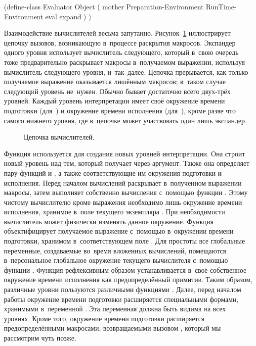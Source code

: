 \begin{code:lisp}
(define-class Evaluator Object
  ( mother
    Preparation-Environment
    RunTime-Environment
    eval
    expand
    ) )
\end{code:lisp}

Взаимодействие вычислителей весьма запутанно.
Рисунок~\ref{macros/macrosystem/eval-level/pic:tower} иллюстрирует цепочку
вызовов, возникающую в~процессе раскрытия макросов. Экспандер одного уровня
использует вычислитель следующего, который в~свою очередь тоже предварительно
раскрывает макросы в~получаемом выражении, используя вычислитель следующего
уровня, и~так~далее. Цепочка прерывается, как только получаемое выражение
оказывается лишённым макросов; в~таком случае следующий уровень не~нужен. Обычно
бывает достаточно всего двух-трёх уровней. Каждый уровень интерпретации имеет
своё окружение времени подготовки (для~) и окружение времени
исполнения (для~), кроме разве что самого нижнего уровня, где в~цепочке
может участвовать один лишь экспандер.

\begin{figure}\centering

\caption{Цепочка вычислителей.}%
\label{macros/macrosystem/eval-level/pic:tower}
\end{figure}

Функция  используется для создания новых уровней
интерпретации. Она строит новый уровень над тем, который получает через
аргумент. Также она определяет пару функций  и , а также
соответствующие им окружения подготовки и исполнения. Перед началом вычислений
 раскрывает в~полученном выражении макросы, затем выполняет собственно
вычисления с~помощью функции . Этому чистому вычислителю кроме
выражения необходимо лишь окружение времени исполнения, хранимое в~поле
 текущего экземпляра . При необходимости
вычислитель может физически изменять данное окружение. Функция 
объектифицирует получаемое выражение с~помощью 
в~окружении времени подготовки, хранимом в~соответствующем поле
. Для простоты все глобальные переменные,
создаваемые во~время вложенных вычислений, помещаются в~персональное
глобальное окружение текущего вычислителя с~помощью функции
. Функция  рефлексивным
образом устанавливается в~своё собственное окружение времени исполнения как
предопределённый примитив. Таким образом, различные уровни пользуются
различными функциями . Далее, перед началом работы окружение
времени подготовки расширяется специальными формами, хранимыми в~переменной
. Эта переменная должна быть видима на всех уровнях.
Кроме того, окружение времени подготовки расширяется предопределёнными
макросами, возвращаемыми вызовом , который
мы рассмотрим чуть позже.

